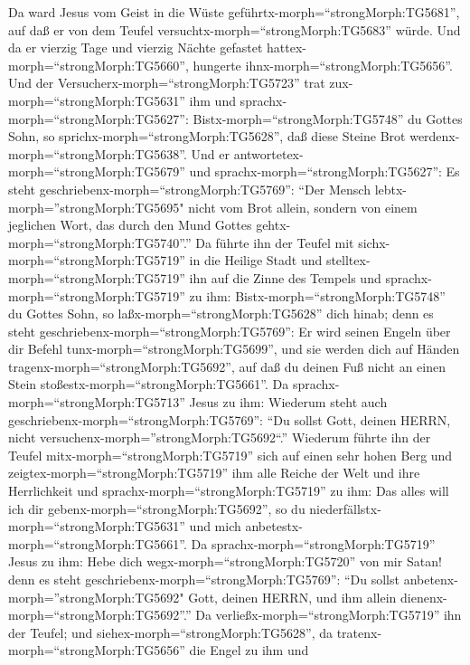  Da ward Jesus vom Geist in die Wüste
geführtx-morph=``strongMorph:TG5681'', auf daß er von dem Teufel
versuchtx-morph=``strongMorph:TG5683'' würde.  Und da er
vierzig Tage und vierzig Nächte gefastet
hattex-morph=``strongMorph:TG5660'', hungerte
ihnx-morph=``strongMorph:TG5656''.  Und der
Versucherx-morph=``strongMorph:TG5723'' trat
zux-morph=``strongMorph:TG5631'' ihm und
sprachx-morph=``strongMorph:TG5627'': Bistx-morph=``strongMorph:TG5748''
du Gottes Sohn, so sprichx-morph=``strongMorph:TG5628'', daß diese
Steine Brot werdenx-morph=``strongMorph:TG5638''.  Und er
antwortetex-morph=``strongMorph:TG5679'' und
sprachx-morph=``strongMorph:TG5627'': Es steht
geschriebenx-morph=``strongMorph:TG5769'': ``Der Mensch
lebtx-morph=''strongMorph:TG5695" nicht vom Brot allein, sondern von
einem jeglichen Wort, das durch den Mund Gottes
gehtx-morph=``strongMorph:TG5740''.''  Da führte ihn der
Teufel mit sichx-morph=``strongMorph:TG5719'' in die Heilige Stadt und
stelltex-morph=``strongMorph:TG5719'' ihn auf die Zinne des Tempels
 und sprachx-morph=``strongMorph:TG5719'' zu ihm:
Bistx-morph=``strongMorph:TG5748'' du Gottes Sohn, so
laßx-morph=``strongMorph:TG5628'' dich hinab; denn es steht
geschriebenx-morph=``strongMorph:TG5769'': Er wird seinen Engeln über
dir Befehl tunx-morph=``strongMorph:TG5699'', und sie werden dich auf
Händen tragenx-morph=``strongMorph:TG5692'', auf daß du deinen Fuß nicht
an einen Stein stoßestx-morph=``strongMorph:TG5661''.  Da
sprachx-morph=``strongMorph:TG5713'' Jesus zu ihm: Wiederum steht auch
geschriebenx-morph=``strongMorph:TG5769'': ``Du sollst Gott, deinen
HERRN, nicht versuchenx-morph=''strongMorph:TG5692``.'' 
Wiederum führte ihn der Teufel mitx-morph=``strongMorph:TG5719'' sich
auf einen sehr hohen Berg und zeigtex-morph=``strongMorph:TG5719'' ihm
alle Reiche der Welt und ihre Herrlichkeit  und
sprachx-morph=``strongMorph:TG5719'' zu ihm: Das alles will ich dir
gebenx-morph=``strongMorph:TG5692'', so du
niederfällstx-morph=``strongMorph:TG5631'' und mich
anbetestx-morph=``strongMorph:TG5661''.  Da
sprachx-morph=``strongMorph:TG5719'' Jesus zu ihm: Hebe dich
wegx-morph=``strongMorph:TG5720'' von mir Satan! denn es steht
geschriebenx-morph=``strongMorph:TG5769'': ``Du sollst
anbetenx-morph=''strongMorph:TG5692" Gott, deinen HERRN, und ihm allein
dienenx-morph=``strongMorph:TG5692''.''  Da
verließx-morph=``strongMorph:TG5719'' ihn der Teufel; und
siehex-morph=``strongMorph:TG5628'', da
tratenx-morph=``strongMorph:TG5656'' die Engel zu ihm und
